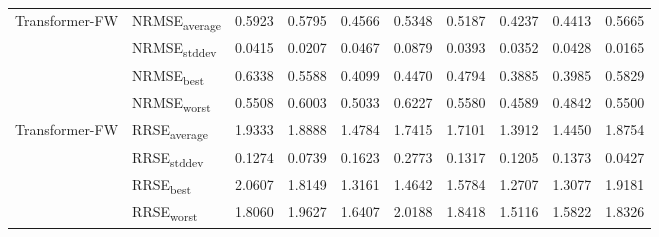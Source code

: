 {\begin{longtable}{l l c c c c c c c c}
\cmidrule(lr){2-10}
\multirow{4}{*}{Transformer-FW} & NRMSE\textsubscript{average} & 0.5923 & 0.5795 & 0.4566 & 0.5348 & 0.5187 & 0.4237 & 0.4413 & 0.5665 \\
 & NRMSE\textsubscript{stddev} & 0.0415 & 0.0207 & 0.0467 & 0.0879 & 0.0393 & 0.0352 & 0.0428 & 0.0165 \\
 & NRMSE\textsubscript{best} & 0.6338 & 0.5588 & 0.4099 & 0.4470 & 0.4794 & 0.3885 & 0.3985 & 0.5829 \\
 & NRMSE\textsubscript{worst} & 0.5508 & 0.6003 & 0.5033 & 0.6227 & 0.5580 & 0.4589 & 0.4842 & 0.5500 \\
\cmidrule(lr){2-10}
\multirow{4}{*}{Transformer-FW} & RRSE\textsubscript{average} & 1.9333 & 1.8888 & 1.4784 & 1.7415 & 1.7101 & 1.3912 & 1.4450 & 1.8754 \\
 & RRSE\textsubscript{stddev} & 0.1274 & 0.0739 & 0.1623 & 0.2773 & 0.1317 & 0.1205 & 0.1373 & 0.0427 \\
 & RRSE\textsubscript{best} & 2.0607 & 1.8149 & 1.3161 & 1.4642 & 1.5784 & 1.2707 & 1.3077 & 1.9181 \\
 & RRSE\textsubscript{worst} & 1.8060 & 1.9627 & 1.6407 & 2.0188 & 1.8418 & 1.5116 & 1.5822 & 1.8326 \\
\cmidrule(lr){2-10}
\end{longtable}
}